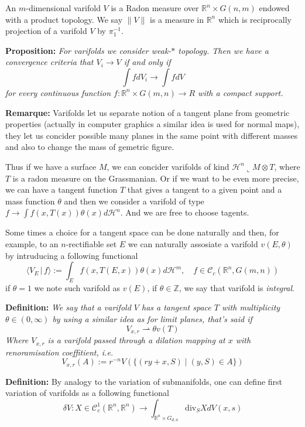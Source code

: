 An $m$-dimensional varifold $V$ is a Radon measure over $\mathbb{R}^n\times
G(n,m)$ endowed with a product topology. We say $\|V\|$ is a measure in
$\mathbb{R}^n$ which is reciprocally projection of a varifold $V$ by $\pi_1^{-1}$.

\vspace{2ex}
\textbf{Proposition:} \textit{For varifolds we consider weak-$*$ topology. Then we have a
convergence criteria that $V_i\rightarrow V$ if and only if
\[\int fdV_i\rightarrow\int fdV\]
for every continuous function $f:\mathbb{R}^n\times G(m,n)\rightarrow R$ with a
compact support.}

\vspace{1ex}
\textbf{Remarque:} Varifolds let us separate notion of a tangent plane from
geometric properties (actually in computer graphics a similar idea is used for
normal maps), they let us concider possible many planes in the same point with
different masses and also to change the mass of gemetric figure.

\vspace{2ex}
Thus if we have a surface $M$, we can concider varifolds of kind $\mathcal H^n
\llcorner M\otimes T$, where $T$ is a radon measure on the Grassmanian. Or if
we want to be even more precise, we can have a tangent function $T$ that gives
a tangent to a given point and a mass function $\theta$ and then we consider a
varifold of type $f\rightarrow \int f(x,T(x))\theta(x)d\mathcal H^n$. And we
are free to choose tagents.

\vspace{2ex}
Some times a choice for a tangent space can be done naturally and then, for
example, to an $n$-rectifiable set $E$ we can naturally assosiate
a varifold $v(E,\theta)$ by intruducing a following functional
\[\langle V_E\,|\, f\rangle:=\int_Ef(x,T(E,x))\theta(x)d\mathcal H^m,\quad f\in\mathcal C_c(\mathbb R^n, G(m,n))\]
if $\theta=1$ we note such varifold as $v(E)$, if $\theta\in\mathbb{Z}$,
we say that varifold is \emph{integral}.

\vspace{2ex}
\textbf{Definition:} \textit{We say that a varifold $V$ has a tangent space $T$
with multiplicity $\theta\in(0,\infty)$ by using a similar idea as for limit
planes, that's said if}
\[V_{x,r}\rightharpoonup \theta v(T)\]
\textit{Where $V_{x,r}$ is a varifold passed through a dilation mapping at $x$
with renoramisation coeffitient, i.e.}
\[V_{x,r}(A):=r^{-n}V(\{(ry+x,S)\;|\;(y,S)\in A\})\]

\vspace{2ex}
\textbf{Definition:} By analogy to the variation of submanifolds, one can define
first variation of varifolds as a following functional
\[\delta V:X\in\mathcal C^1_c(\mathbb R^n,\mathbb R^n)\rightarrow\int_{\mathbb R^n\times G_{d,n}}\text{div}_SXdV(x,s)\]

